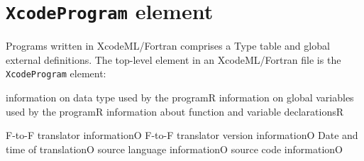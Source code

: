 \section{ {\tt XcodeProgram} element}

Programs written in XcodeML/Fortran comprises a Type table and global external definitions. The top-level element in an XcodeML/Fortran file is the {\tt XcodeProgram} element:


\begin{XcodeMLChildElements}
{information on data type used by the program}{R}
{information on global variables used by the program}{R}
{information about function and variable declarations}{R}
\end{XcodeMLChildElements}

\begin{XcodeMLAttributes}
{F-to-F translator information}{O}
{F-to-F translator version information}{O}
{Date and time of translation}{O}
{source language information}{O}
{source code information}{O}
\end{XcodeMLAttributes}



